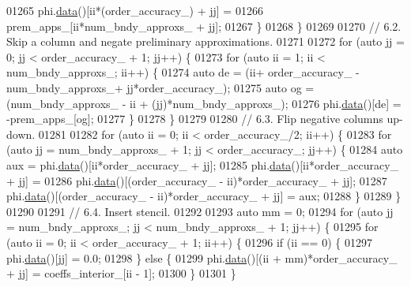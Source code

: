 \begin{DoxyCode}
{{01265         phi.\hyperlink{classmtk_1_1DenseMatrix_a0c33b8a9e01d157c61ddbdf807c25d84}{data}()[ii*(order\_accuracy\_) + jj] =
01266           prem\_apps\_[ii*num\_bndy\_approxs\_ + jj];
01267       \}
01268     \}
01269 
01270     \textcolor{comment}{// 6.2. Skip a column and negate preliminary approximations.}
01271 
01272     \textcolor{keywordflow}{for} (\textcolor{keyword}{auto} jj = 0; jj < order\_accuracy\_ + 1; jj++) \{
01273       \textcolor{keywordflow}{for} (\textcolor{keyword}{auto} ii = 1; ii < num\_bndy\_approxs\_; ii++) \{
01274         \textcolor{keyword}{auto} de = (ii+ order\_accuracy\_ - num\_bndy\_approxs\_+ jj*order\_accuracy\_);
01275         \textcolor{keyword}{auto} og = (num\_bndy\_approxs\_ - ii + (jj)*num\_bndy\_approxs\_);
01276         phi.\hyperlink{classmtk_1_1DenseMatrix_a0c33b8a9e01d157c61ddbdf807c25d84}{data}()[de] = -prem\_apps\_[og];
01277       \}
01278     \}
01279 
01280     \textcolor{comment}{// 6.3. Flip negative columns up-down.}
01281 
01282     \textcolor{keywordflow}{for} (\textcolor{keyword}{auto} ii = 0; ii < order\_accuracy\_/2; ii++) \{
01283       \textcolor{keywordflow}{for} (\textcolor{keyword}{auto} jj = num\_bndy\_approxs\_ + 1; jj < order\_accuracy\_; jj++) \{
01284         \textcolor{keyword}{auto} aux = phi.\hyperlink{classmtk_1_1DenseMatrix_a0c33b8a9e01d157c61ddbdf807c25d84}{data}()[ii*order\_accuracy\_ + jj];
01285         phi.\hyperlink{classmtk_1_1DenseMatrix_a0c33b8a9e01d157c61ddbdf807c25d84}{data}()[ii*order\_accuracy\_ + jj] =
01286           phi.\hyperlink{classmtk_1_1DenseMatrix_a0c33b8a9e01d157c61ddbdf807c25d84}{data}()[(order\_accuracy\_ - ii)*order\_accuracy\_ + jj];
01287         phi.\hyperlink{classmtk_1_1DenseMatrix_a0c33b8a9e01d157c61ddbdf807c25d84}{data}()[(order\_accuracy\_ - ii)*order\_accuracy\_ + jj] = aux;
01288       \}
01289     \}
01290 
01291     \textcolor{comment}{// 6.4. Insert stencil.}
01292 
01293     \textcolor{keyword}{auto} mm = 0;
01294     \textcolor{keywordflow}{for} (\textcolor{keyword}{auto} jj = num\_bndy\_approxs\_; jj < num\_bndy\_approxs\_ +  1; jj++) \{
01295       \textcolor{keywordflow}{for} (\textcolor{keyword}{auto} ii = 0; ii < order\_accuracy\_ + 1; ii++) \{
01296         \textcolor{keywordflow}{if} (ii == 0) \{
01297           phi.\hyperlink{classmtk_1_1DenseMatrix_a0c33b8a9e01d157c61ddbdf807c25d84}{data}()[jj] = 0.0;
01298         \} \textcolor{keywordflow}{else} \{
01299           phi.\hyperlink{classmtk_1_1DenseMatrix_a0c33b8a9e01d157c61ddbdf807c25d84}{data}()[(ii + mm)*order\_accuracy\_ + jj] = coeffs\_interior\_[ii - 1];
01300         \}
01301       \}
}}
\end{DoxyCode}
